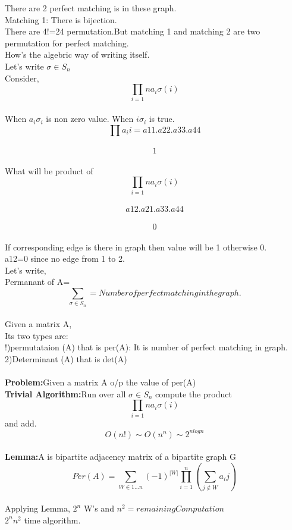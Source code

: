 There are 2 perfect matching is in these graph.\\
Matching 1: There is bijection.\\
There are 4!=24 permutation.But matching 1 and matching 2 are two permutation for perfect matching.\\
How's the algebric way of writing itself.\\
Let's write $\sigma \in S_n$ \\
Consider,\\
$$ \prod_{i=1}{n} a_i \sigma(i)$$\\
When $a_i \sigma_i$ is non zero value.
When $i\sigma _i$ is true.\\
$$\prod a_ii = a11 .a22 .a33. a44$$\\
$$ 1 $$\\
What will be product of \\
$$\prod_{i=1}{n} a_i \sigma(i) $$\\
$$ a12. a21.a33.a44  $$\\
$$ 0  $$\\
If corresponding edge is there in graph then value will be 1 otherwise 0.\\
a12=0 since no edge from 1 to 2.\\
Let's write,\\
Permanant of A=\\
$$ \sum_{\sigma \in S_n}  = Number of perfect matching in the graph.$$\\
Given a matrix A,\\
Its two types are:\\
!)permutataion (A) that is per(A): It is number of perfect matching in graph.\\
2)Determinant (A) that is det(A)\\
\\
\textbf{Problem:}Given a matrix A o/p the value of per(A)\\
\textbf{Trivial Algorithm:}Run over all $\sigma \in S_n$ compute the product \\
$$\prod_{i=1}{n}a_i \sigma(i)$$ and add.\\
$$O(n!) \sim O(n ^{n}) \sim 2^{nlogn} $$\\
\textbf{Lemma:}A is bipartite adjacency matrix of a bipartite graph G\\
$$Per(A) = \sum_{W \in {1...n}}(-1)^{|W|} \prod_{i=1}^{n}(\sum_{j \notin W}a_ij)$$\\
Applying Lemma, $2^{n}$ W's and $n^{2}=remaining Computation$\\
$2^{n}n^{2}$ time algorithm.\\

